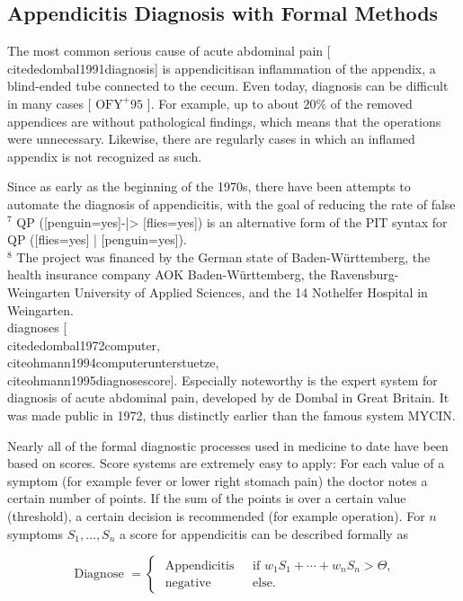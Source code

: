 \documentclass[10pt]{book}
\begin{document}
\subsection{Appendicitis Diagnosis with Formal Methods}
The most common serious cause of acute abdominal pain [\\cite{dedombal1991diagnosis}] is appendicitisan inflammation of the appendix, a blind-ended tube connected to the cecum. Even today, diagnosis can be difficult in many cases [ $\mathrm{OFY}^{+} 95$ ]. For example, up to about $20 \%$ of the removed appendices are without pathological findings, which means that the operations were unnecessary. Likewise, there are regularly cases in which an inflamed appendix is not recognized as such.

Since as early as the beginning of the 1970s, there have been attempts to automate the diagnosis of appendicitis, with the goal of reducing the rate of false\\
${ }^{7}$ QP ([penguin=yes]-|> [flies=yes]) is an alternative form of the PIT syntax for QP ([flies=yes] | [penguin=yes]).\\
${ }^{8}$ The project was financed by the German state of Baden-Württemberg, the health insurance company AOK Baden-Württemberg, the Ravensburg-Weingarten University of Applied Sciences, and the 14 Nothelfer Hospital in Weingarten.\\[0pt]
diagnoses [\\cite{dedombal1972computer}, \\cite{ohmann1994computerunterstuetze}, \\cite{ohmann1995diagnosescore}]. Especially noteworthy is the expert system for diagnosis of acute abdominal pain, developed by de Dombal in Great Britain. It was made public in 1972, thus distinctly earlier than the famous system MYCIN.


Nearly all of the formal diagnostic processes used in medicine to date have been based on scores. Score systems are extremely easy to apply: For each value of a symptom (for example fever or lower right stomach pain) the doctor notes a certain number of points. If the sum of the points is over a certain value (threshold), a certain decision is recommended (for example operation). For $n$ symptoms $S_{1}, \ldots, S_{n}$ a score for appendicitis can be described formally as

$$
\text { Diagnose }= \begin{cases}\text { Appendicitis } & \text { if } w_{1} S_{1}+\cdots+w_{n} S_{n}>\Theta, \\ \text { negative } & \text { else. }\end{cases}
$$
\end{document}
